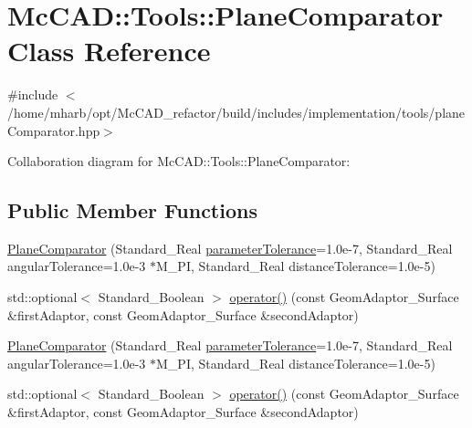 \hypertarget{classMcCAD_1_1Tools_1_1PlaneComparator}{}\section{Mc\+C\+AD\+:\+:Tools\+:\+:Plane\+Comparator Class Reference}
\label{classMcCAD_1_1Tools_1_1PlaneComparator}


{\ttfamily \#include $<$/home/mharb/opt/\+Mc\+C\+A\+D\+\_\+refactor/build/includes/implementation/tools/plane\+Comparator.\+hpp$>$}



Collaboration diagram for Mc\+C\+AD\+:\+:Tools\+:\+:Plane\+Comparator\+:
\subsection*{Public Member Functions}
\begin{DoxyCompactItemize}
\item 
\hyperlink{classMcCAD_1_1Tools_1_1PlaneComparator_a01aad597a147022419ddbb4625c6370d}{Plane\+Comparator} (Standard\+\_\+\+Real \hyperlink{classMcCAD_1_1Tools_1_1PlaneComparator_adef35ba390ab77e8e03eadec54a87d5d}{parameter\+Tolerance}=1.\+0e-\/7, Standard\+\_\+\+Real angular\+Tolerance=1.\+0e-\/3 $\ast$\+M\+\_\+\+P\+I, Standard\+\_\+\+Real distance\+Tolerance=1.\+0e-\/5)
\item 
std\+::optional$<$ Standard\+\_\+\+Boolean $>$ \hyperlink{classMcCAD_1_1Tools_1_1PlaneComparator_a179788a56a6c3b5ca10c5d0a5f2c3622}{operator()} (const Geom\+Adaptor\+\_\+\+Surface \&first\+Adaptor, const Geom\+Adaptor\+\_\+\+Surface \&second\+Adaptor)
\item 
\hyperlink{classMcCAD_1_1Tools_1_1PlaneComparator_a01aad597a147022419ddbb4625c6370d}{Plane\+Comparator} (Standard\+\_\+\+Real \hyperlink{classMcCAD_1_1Tools_1_1PlaneComparator_adef35ba390ab77e8e03eadec54a87d5d}{parameter\+Tolerance}=1.\+0e-\/7, Standard\+\_\+\+Real angular\+Tolerance=1.\+0e-\/3 $\ast$\+M\+\_\+\+P\+I, Standard\+\_\+\+Real distance\+Tolerance=1.\+0e-\/5)
\item 
std\+::optional$<$ Standard\+\_\+\+Boolean $>$ \hyperlink{classMcCAD_1_1Tools_1_1PlaneComparator_a65ce918d05f4784556212045fe4ceddc}{operator()} (const Geom\+Adaptor\+\_\+\+Surface \&first\+Adaptor, const Geom\+Adaptor\+\_\+\+Surface \&second\+Adaptor)
\end{DoxyCompactItemize}
